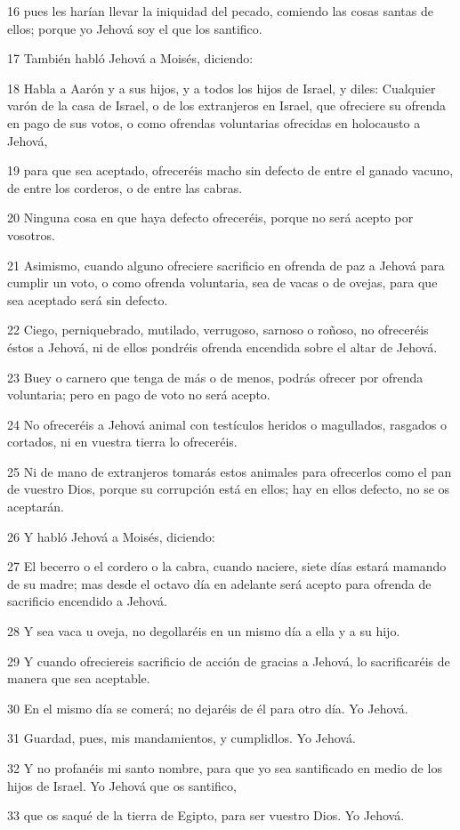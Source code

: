 \par 16 pues les harían llevar la iniquidad del pecado, comiendo las cosas santas de ellos; porque yo Jehová soy el que los santifico.
\par 17 También habló Jehová a Moisés, diciendo:
\par 18 Habla a Aarón y a sus hijos, y a todos los hijos de Israel, y diles: Cualquier varón de la casa de Israel, o de los extranjeros en Israel, que ofreciere su ofrenda en pago de sus votos, o como ofrendas voluntarias ofrecidas en holocausto a Jehová,
\par 19 para que sea aceptado, ofreceréis macho sin defecto de entre el ganado vacuno, de entre los corderos, o de entre las cabras.
\par 20 Ninguna cosa en que haya defecto ofreceréis, porque no será acepto por vosotros.
\par 21 Asimismo, cuando alguno ofreciere sacrificio en ofrenda de paz a Jehová para cumplir un voto, o como ofrenda voluntaria, sea de vacas o de ovejas, para que sea aceptado será sin defecto.
\par 22 Ciego, perniquebrado, mutilado, verrugoso, sarnoso o roñoso, no ofreceréis éstos a Jehová, ni de ellos pondréis ofrenda encendida sobre el altar de Jehová.
\par 23 Buey o carnero que tenga de más o de menos, podrás ofrecer por ofrenda voluntaria; pero en pago de voto no será acepto.
\par 24 No ofreceréis a Jehová animal con testículos heridos o magullados, rasgados o cortados, ni en vuestra tierra lo ofreceréis.
\par 25 Ni de mano de extranjeros tomarás estos animales para ofrecerlos como el pan de vuestro Dios, porque su corrupción está en ellos; hay en ellos defecto, no se os aceptarán.
\par 26 Y habló Jehová a Moisés, diciendo:
\par 27 El becerro o el cordero o la cabra, cuando naciere, siete días estará mamando de su madre; mas desde el octavo día en adelante será acepto para ofrenda de sacrificio encendido a Jehová.
\par 28 Y sea vaca u oveja, no degollaréis en un mismo día a ella y a su hijo.
\par 29 Y cuando ofreciereis sacrificio de acción de gracias a Jehová, lo sacrificaréis de manera que sea aceptable.
\par 30 En el mismo día se comerá; no dejaréis de él para otro día. Yo Jehová.
\par 31 Guardad, pues, mis mandamientos, y cumplidlos. Yo Jehová.
\par 32 Y no profanéis mi santo nombre, para que yo sea santificado en medio de los hijos de Israel. Yo Jehová que os santifico,
\par 33 que os saqué de la tierra de Egipto, para ser vuestro Dios. Yo Jehová.


